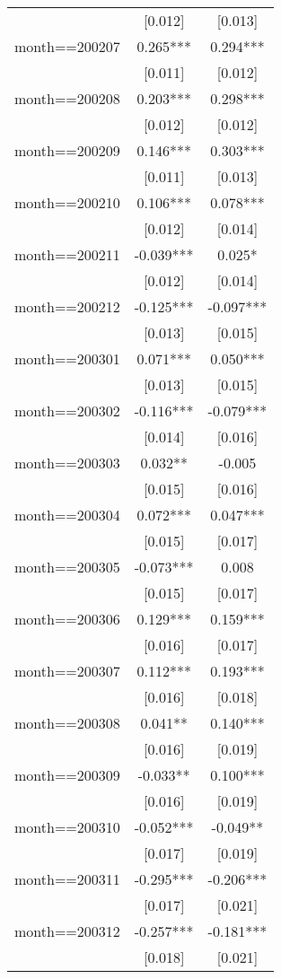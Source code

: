 \documentclass[]{article}
\begin{document}
\begin{tabular}{lcc}
 & [0.012] & [0.013] \\
month==200207 & 0.265*** & 0.294*** \\
 & [0.011] & [0.012] \\
month==200208 & 0.203*** & 0.298*** \\
 & [0.012] & [0.012] \\
month==200209 & 0.146*** & 0.303*** \\
 & [0.011] & [0.013] \\
month==200210 & 0.106*** & 0.078*** \\
 & [0.012] & [0.014] \\
month==200211 & -0.039*** & 0.025* \\
 & [0.012] & [0.014] \\
month==200212 & -0.125*** & -0.097*** \\
 & [0.013] & [0.015] \\
month==200301 & 0.071*** & 0.050*** \\
 & [0.013] & [0.015] \\
month==200302 & -0.116*** & -0.079*** \\
 & [0.014] & [0.016] \\
month==200303 & 0.032** & -0.005 \\
 & [0.015] & [0.016] \\
month==200304 & 0.072*** & 0.047*** \\
 & [0.015] & [0.017] \\
month==200305 & -0.073*** & 0.008 \\
 & [0.015] & [0.017] \\
month==200306 & 0.129*** & 0.159*** \\
 & [0.016] & [0.017] \\
month==200307 & 0.112*** & 0.193*** \\
 & [0.016] & [0.018] \\
month==200308 & 0.041** & 0.140*** \\
 & [0.016] & [0.019] \\
month==200309 & -0.033** & 0.100*** \\
 & [0.016] & [0.019] \\
month==200310 & -0.052*** & -0.049** \\
 & [0.017] & [0.019] \\
month==200311 & -0.295*** & -0.206*** \\
 & [0.017] & [0.021] \\
month==200312 & -0.257*** & -0.181*** \\
 & [0.018] & [0.021] \\

\end{tabular}
\end{document}
